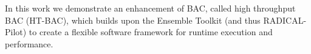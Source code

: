 
In this work we demonstrate an enhancement of BAC, called high throughput BAC
(HT-BAC), which builds upon the Ensemble Toolkit (and thus RADICAL-Pilot) to
create a flexible software framework for runtime execution and performance.
